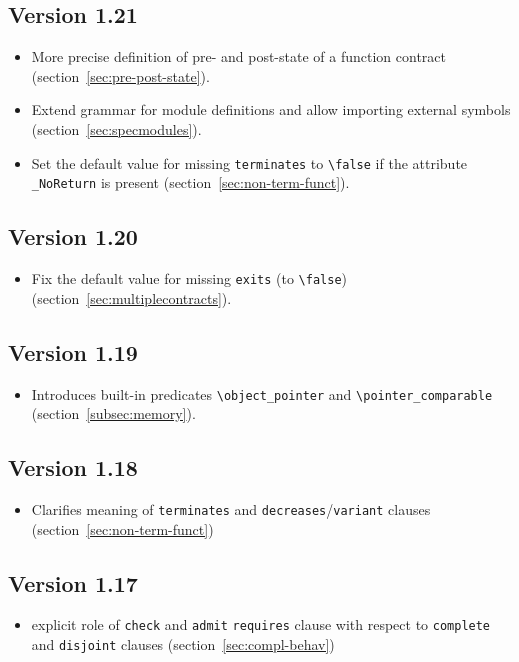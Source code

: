 \subsection{Version 1.21}
\begin{itemize}
\item More precise definition of pre- and post-state of a function contract
  (section~\ref{sec:pre-post-state}).
\item Extend grammar for module definitions and allow importing external symbols
  (section~\ref{sec:specmodules}).
\item Set the default value for missing \lstinline|terminates| to
  \lstinline|\false| if the attribute \lstinline|_NoReturn| is present
  (section~\ref{sec:non-term-funct}).
\end{itemize}
\subsection{Version 1.20}
\begin{itemize}
\item Fix the default value for missing \lstinline|exits| (to
\lstinline|\false|) (section~\ref{sec:multiplecontracts}).
\end{itemize}
\subsection{Version 1.19}
\begin{itemize}
\item Introduces built-in predicates \lstinline|\object_pointer| and
\lstinline|\pointer_comparable| (section~\ref{subsec:memory}).
\end{itemize}
\subsection{Version 1.18}
\begin{itemize}
\item Clarifies meaning of \lstinline|terminates| and
  \lstinline|decreases|/\lstinline|variant| clauses (section~\ref{sec:non-term-funct})
\end{itemize}
\subsection{Version 1.17}
\begin{itemize}
\item explicit role of \lstinline|check| and \lstinline|admit| \lstinline|requires|
clause with respect to \lstinline|complete| and \lstinline|disjoint| clauses
(section~\ref{sec:compl-behav})
\end{itemize}
